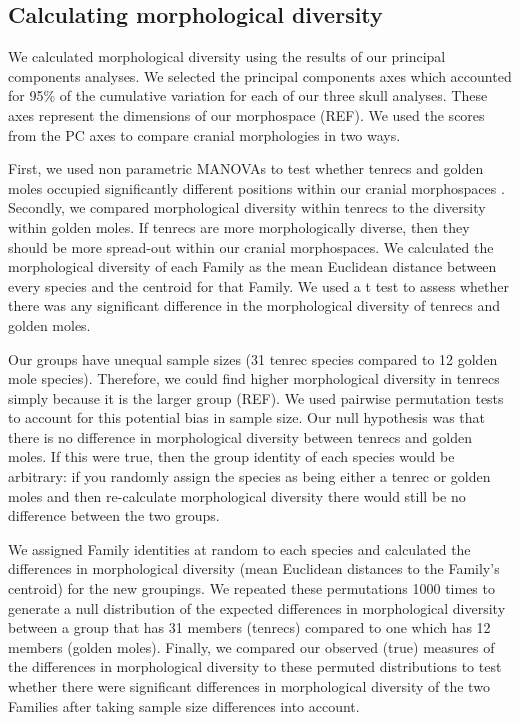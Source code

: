 \documentclass[12pt,a4paper]{article}
\begin{document}
	
\subsection{Calculating morphological diversity}



	We calculated morphological diversity using the results of our principal components analyses. We selected the principal components axes which accounted for 95\% of the cumulative variation for each of our three skull analyses. These axes represent the dimensions of our morphospace (REF). We used the scores from the PC axes to compare cranial morphologies in two ways.
	
	First, we used non parametric MANOVAs \citep{Anderson2001} to test whether tenrecs and golden moles occupied significantly different positions within our cranial morphospaces \citep[e.g][]{Serb2011, Ruta2013}.
	Secondly, we compared morphological diversity within tenrecs to the diversity within golden moles. If tenrecs are more morphologically diverse, then they should be more spread-out within our cranial morphospaces. We calculated the morphological diversity of each Family as the mean Euclidean distance between every species and the centroid for that Family. We used a t test to assess whether there was any significant difference in the morphological diversity of tenrecs and golden moles.
	
	Our groups have unequal sample sizes (31 tenrec species compared to 12 golden mole species). Therefore, we could find higher morphological diversity in tenrecs simply because it is the larger group (REF). We used pairwise permutation tests to account for this potential bias in sample size. Our null hypothesis was that there is no difference in morphological diversity between tenrecs and golden moles. If this were true, then the group identity of each species would be arbitrary: if you randomly assign the species as being either a tenrec or golden moles and then re-calculate morphological diversity there would still be no difference between the two groups. 
	
	We assigned Family identities at random to each species and calculated the differences in morphological diversity (mean Euclidean distances to the Family's centroid) for the new groupings. We repeated these permutations 1000 times to generate a null distribution of the expected differences in morphological diversity between a group that has 31 members (tenrecs) compared to one which has 12 members (golden moles). Finally, we compared our observed (true) measures of the differences in morphological diversity to these permuted distributions to test whether there were significant differences in morphological diversity of the two Families after taking sample size differences into account.
	 
\end{document}
